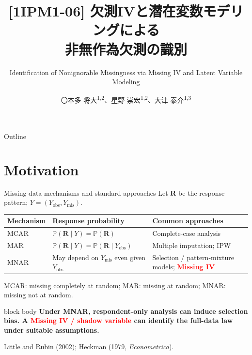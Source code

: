\documentclass[aspectratio=169,10pt]{beamer}
\title{[1IPM1-06] 欠測IVと潜在変数モデリングによる\\非無作為欠測の識別}
\subtitle{Identification of Nonignorable Missingness via Missing IV and Latent Variable Modeling}
\author{〇本多 将大\textsuperscript{1,2}、星野 崇宏\textsuperscript{1,2}、大津 泰介\textsuperscript{1,3}}
\institute{1. 慶應義塾大学、2. 理化学研究所、3. London School of Economics and Political Science}
\date{}
\newcommand{\slideannotation}{\fontsize{8pt}{9.6pt}\selectfont}
\renewcommand{\arraystretch}{1.14}
\newcommand{\Prb}{\mathbb P}
\newcommand{\redkey}[1]{\textcolor{Red}{\textbf{#1}}}
\newenvironment{takeaway}{%
  \begin{beamercolorbox}[rounded=true,sep=.7em,wd=\linewidth]{block body}%
  \color{Navy}\bfseries}{\end{beamercolorbox}}
\begin{document}
\begin{frame}[plain]
\vspace{1.35cm}
\titlepage
\end{frame}

\begin{frame}{Outline}
\tableofcontents[hideallsubsections]
\end{frame}

\section{Motivation}
\begin{frame}{Missing-data mechanisms and standard approaches}
Let $\bm R$ be the response pattern; $Y=(Y_{\mathrm{obs}},Y_{\mathrm{mis}})$.
\smallskip
\renewcommand{\arraystretch}{1.05}
\begin{tabular}{@{}p{.19\linewidth}p{.40\linewidth}p{.36\linewidth}@{}}
\toprule
Mechanism & Response probability & Common approaches\\
\midrule
MCAR & $\Prb(\bm R\mid Y)=\Prb(\bm R)$ & Complete-case analysis\\[.5em]
MAR & $\Prb(\bm R\mid Y)=\Prb(\bm R\mid Y_{\mathrm{obs}})$ & Multiple imputation; IPW\\[.5em]
MNAR & May depend on $Y_{\mathrm{mis}}$ even given $Y_{\mathrm{obs}}$ & Selection / pattern-mixture models; \redkey{Missing IV}\\
\bottomrule
\end{tabular}
\medskip
MCAR: missing completely at random; MAR: missing at random; MNAR: missing not at random.\vspace{-1pt}
\begin{takeaway}
Under MNAR, respondent-only analysis can induce selection bias. A \redkey{Missing IV / shadow variable} can identify the full-data law under suitable assumptions.
\end{takeaway}
{\slideannotation Little and Rubin (2002); Heckman (1979, \emph{Econometrica}).}
\end{frame}
\end{document}
